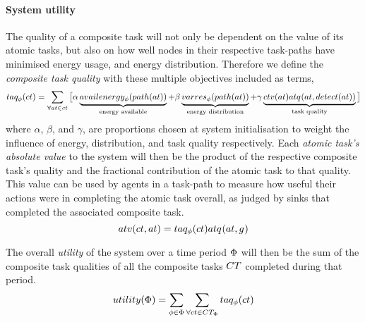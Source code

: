 \paragraph{System utility}
The quality of a composite task will not only be dependent on the value of its atomic tasks, but also on how well nodes in their respective task-paths have minimised energy usage, and energy distribution. Therefore we define the \textit{composite task quality} with these multiple objectives included as terms,
\begin{equation}
	\label{eq:ctv}
	\functionCompositeTaskQuality{}{} = 
	\sum\limits_{\forall \varAtomicTask{}{} \in \varCompositeTask{}{}}
	\big\lbrack
	\alpha\underbrace{\functionEnergyAvailable{\functionTaskArc{}{}}{}}_{\text{energy available}}
	+ \beta\underbrace{\functionEnergyVariability{\functionTaskArc{}{}}{}}_{\text{energy distribution}}
	+ 
	\gamma\underbrace{
		\functionComponentTaskValue{}{}
		\functionAtomicTaskQualitySignature{\varAtomicTask{}{}}{\functionDetectorRole{}{}}
	}_{\text{task quality}}
\big\rbrack
\end{equation}
where $\alpha$, $\beta$, and $\gamma$, are proportions chosen at system initialisation to weight the influence of energy, distribution, and task quality respectively. Each \textit{atomic task's absolute value} to the system will then be the product of the respective composite task's quality and the fractional contribution of the atomic task to that quality. This value can be used by agents in a task-path to measure how useful their actions were in completing the atomic task overall, as judged by sinks that completed the associated composite task.
\begin{equation}
	\functionTaskAbsoluteValue{}{} = 
	\functionCompositeTaskQuality{}{}
	\functionAtomicTaskQualitySignature{}{}
\end{equation}

The overall \textit{ utility} of the system over a time period $\Phi$ will then be the sum of the composite task qualities of all the composite tasks $\setCompositeTask{}{}$ completed during that period.
	\begin{equation}
		\label{eq:system_utility}
		\functionSystemUtility{}{} = \sum\limits_{\varTime{}{} \in \setTime{}{}}
		\sum\limits_{\forall \varCompositeTask{}{} \in \setCompositeTask{\setTime{}{}}{}}
		\functionCompositeTaskQuality{}{}
	\end{equation}